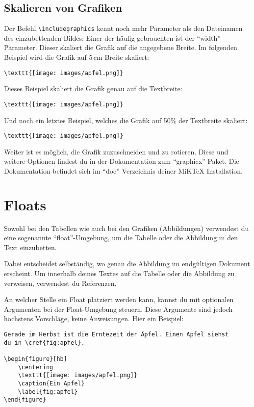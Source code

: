 \subsection{Skalieren von Grafiken}

Der Befehl \texttt{\textbackslash includegraphics} kennt noch mehr Parameter als den Dateinamen des einzubettenden Bildes: Einer der häufig gebrauchten ist der \enquote{width} Parameter. Dieser skaliert die Grafik auf die angegebene Breite. Im folgenden Beispiel wird die Grafik auf 5\,cm Breite skaliert:
\begin{lstlisting}
\texttt{[image: images/apfel.png]}
\end{lstlisting}

Dieses Beispiel skaliert die Grafik genau auf die Textbreite: 
\begin{lstlisting}
\texttt{[image: images/apfel.png]}
\end{lstlisting}

Und noch ein letztes Beispiel, welches die Grafik auf 50\% der Textbreite skaliert:
\begin{lstlisting}
\texttt{[image: images/apfel.png]}
\end{lstlisting}

Weiter ist es möglich, die Grafik zuzuschneiden und zu rotieren. Diese und weitere Optionen findest du in der Dokumentation zum \enquote{graphicx} Paket. Die Dokumentation befindet sich im \enquote{doc} Verzeichnis deiner MiKTeX Installation.

\section{Floats}

Sowohl bei den Tabellen wie auch bei den Grafiken (Abbildungen) verwendest du eine sogenannte \enquote{float}-Umgebung, um die Tabelle oder die Abbildung in den Text einzubetten.

Dabei entscheidet \DMLLaTeX{} selbständig, wo genau die Abbildung im endgültigen Dokument erscheint. Um innerhalb deines Textes auf die Tabelle oder die Abbildung zu verweisen, verwendest du Referenzen.

An welcher Stelle ein Float platziert werden kann, kannst du mit optionalen Argumenten bei der Float-Umgebung steuern. Diese Argumente sind jedoch höchstens Vorschläge, keine Anweisungen. Hier ein Beispiel:
\begin{lstlisting}
Gerade im Herbst ist die Erntezeit der Äpfel. Einen Apfel siehst
du in \cref{fig:apfel}.

\begin{figure}[hb]
	\centering
	\texttt{[image: images/apfel.png]}
	\caption{Ein Apfel}
	\label{fig:apfel}
\end{figure}
\end{lstlisting}

